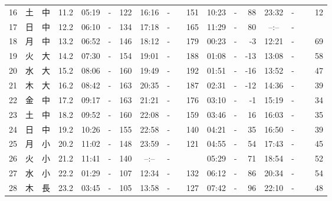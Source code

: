 \documentclass[12pt,a4j]{jsarticle}
\begin{document}
\begin{table}[htbp]
\begin{center}
\begin{tabular}{|rc|cr|ccrccr|ccrccr|}
16 & 土 & 中 & 11.2 &  05:19 &-& 122  &  16:16 &-& 151  &   10:23 &-&  88  &   23:32 &-&  12  \\
17 & 日 & 中 & 12.2 &  06:10 &-& 134  &  17:18 &-& 165  &   11:29 &-&  80  &   --:-- &-&~~~~~ \\
18 & 月 & 中 & 13.2 &  06:52 &-& 146  &  18:12 &-& 179  &   00:23 &-&  -3  &   12:21 &-&  69  \\
19 & 火 & 大 & 14.2 &  07:30 &-& 154  &  19:01 &-& 188  &   01:08 &-& -13  &   13:08 &-&  58  \\
20 & 水 & 大 & 15.2 &  08:06 &-& 160  &  19:49 &-& 192  &   01:51 &-& -16  &   13:52 &-&  47  \\
21 & 木 & 大 & 16.2 &  08:42 &-& 163  &  20:35 &-& 187  &   02:31 &-& -12  &   14:36 &-&  39  \\
22 & 金 & 中 & 17.2 &  09:17 &-& 163  &  21:21 &-& 176  &   03:10 &-&  -1  &   15:19 &-&  34  \\
23 & 土 & 中 & 18.2 &  09:52 &-& 160  &  22:08 &-& 159  &   03:46 &-&  16  &   16:03 &-&  35  \\
24 & 日 & 中 & 19.2 &  10:26 &-& 155  &  22:58 &-& 140  &   04:21 &-&  35  &   16:50 &-&  39  \\
25 & 月 & 小 & 20.2 &  11:02 &-& 148  &  23:59 &-& 121  &   04:55 &-&  54  &   17:43 &-&  45  \\
26 & 火 & 小 & 21.2 &  11:41 &-& 140  &  --:-- &-&~~~~~ &   05:29 &-&  71  &   18:54 &-&  52  \\
27 & 水 & 小 & 22.2 &  01:29 &-& 107  &  12:34 &-& 132  &   06:12 &-&  86  &   20:34 &-&  54  \\
28 & 木 & 長 & 23.2 &  03:45 &-& 105  &  13:58 &-& 127  &   07:42 &-&  96  &   22:10 &-&  48  \\
   \hline
   \end{tabular}
   \end{center}
\end{table}
\newpage
\end{document}
